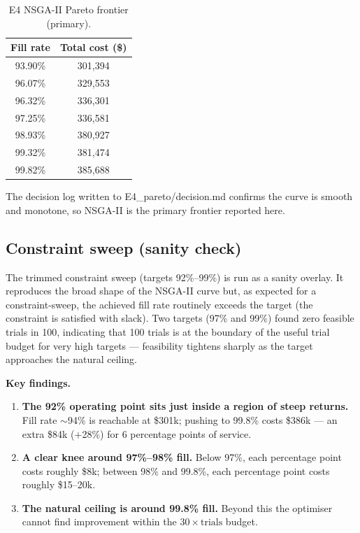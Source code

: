 \begin{table}[htbp]
  \centering
  \caption{E4 NSGA-II Pareto frontier (primary).}
  \label{tab:e4-nsga2}
  \begin{tabular}{@{}cc@{}}
    \toprule
    Fill rate & Total cost (\$) \\
    \midrule
    93.90\% & 301,394 \\
    96.07\% & 329,553 \\
    96.32\% & 336,301 \\
    97.25\% & 336,581 \\
    98.93\% & 380,927 \\
    99.32\% & 381,474 \\
    99.82\% & 385,688 \\
    \bottomrule
  \end{tabular}
\end{table}

The decision log written to E4\_pareto/decision.md confirms the
curve is smooth and monotone, so NSGA-II is the primary frontier
reported here.

\subsection{Constraint sweep (sanity check)}

The trimmed constraint sweep (targets 92\%--99\%) is run as a sanity
overlay.  It reproduces the broad shape of the NSGA-II curve but, as
expected for a constraint-sweep, the achieved fill rate routinely
exceeds the target (the constraint is satisfied with slack).  Two
targets (97\% and 99\%) found zero feasible trials in 100, indicating
that 100 trials is at the boundary of the useful trial budget for very
high targets — feasibility tightens sharply as the target approaches
the natural ceiling.

\textbf{Key findings.}
\begin{enumerate}
  \item \textbf{The 92\% operating point sits just inside a region of
        steep returns.}  Fill rate $\sim$94\% is reachable at
        \$301k; pushing to 99.8\% costs \$386k — an extra \$84k
        ($+$28\%) for 6 percentage points of service.

  \item \textbf{A clear knee around 97\%--98\% fill.}  Below 97\%,
        each percentage point costs roughly \$8k; between 98\% and
        99.8\%, each percentage point costs roughly \$15--20k.

  \item \textbf{The natural ceiling is around 99.8\% fill.}  Beyond
        this the optimiser cannot find improvement within the
        $30 \times \text{trials}$ budget.
\end{enumerate}


